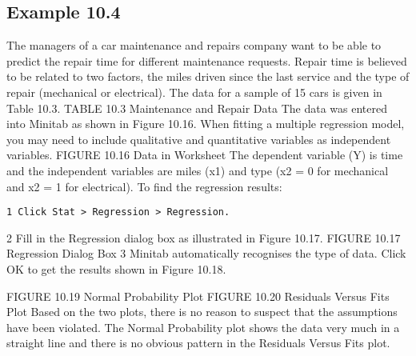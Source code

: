 \documentclass[]{report}
\begin{document}
\subsection*{Example 10.4}
The managers of a car maintenance and repairs company want to be able to predict the
repair time for different maintenance requests. Repair time is believed to be related to
two factors, the miles driven since the last service and the type of repair (mechanical
or electrical). The data for a sample of 15 cars is given in Table 10.3.
TABLE 10.3 Maintenance and Repair Data
The data was entered into Minitab as shown in Figure 10.16.
When fitting a multiple regression model, you may need to include
qualitative and quantitative variables as independent variables.
FIGURE 10.16 Data in Worksheet
The dependent variable (Y) is time and the independent variables are miles (x1) and
type (x2 = 0 for mechanical and x2 = 1 for electrical).
To find the regression results:
\begin{verbatim}
1 Click Stat > Regression > Regression.
\end{verbatim}

2 Fill in the Regression dialog box as illustrated in Figure 10.17.
FIGURE 10.17 Regression Dialog Box
3 Minitab automatically recognises the type of data. Click OK to get the results
shown in Figure 10.18.


FIGURE 10.19 Normal Probability Plot
FIGURE 10.20 Residuals Versus Fits Plot
Based on the two plots, there is no reason to suspect that the assumptions have been
violated. The Normal Probability plot shows the data very much in a straight line and
there is no obvious pattern in the Residuals Versus Fits plot.
\newpage
\end{document}
